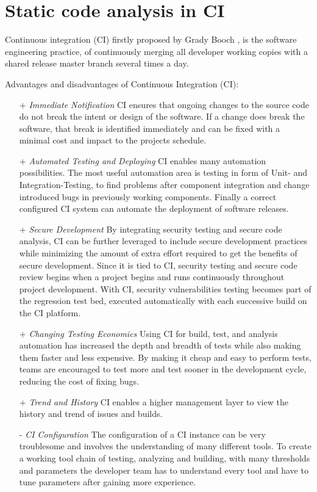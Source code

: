 \documentclass[conference]{IEEEtran}
\begin{document}
\section{Static code analysis in CI}
\label{sec:static_code_analysis_ci}
Continuous integration (CI) firstly proposed by Grady Booch \cite{CI-Definition:Booch:1993}, is the software engineering practice, of continuously merging all developer working copies with a shared release master branch several times a day.

Advantages and disadvantages of Continuous Integration (CI)\cite{SecurityinCI}:
\begin{itemize}
	\item[+] \textit{Immediate Notification}
	CI ensures that ongoing changes to the source code do not break the intent or design of the software. If a change does break the software, that break is identified immediately and can be fixed with a minimal cost and impact to the projects schedule.
	\item[+] \textit{Automated Testing and Deploying}
	CI enables many automation possibilities. The most useful automation area is testing in form of Unit- and Integration-Testing, to find problems after component integration and change introduced bugs in previously working components. 
	Finally a correct configured CI system can automate the deployment of software releases. 
	\item[+] \textit{Secure Development}
	By integrating security testing and secure code analysis, CI can be further leveraged to include secure development practices while minimizing the amount of extra effort required to get the benefits of secure development. Since it is tied to CI,
	security testing and secure code review begins when a project begins and runs continuously
	throughout project development. With CI, security vulnerabilities testing becomes part of the regression test bed, executed automatically with each successive build on the CI platform.
	
	\item[+] \textit{Changing Testing Economics}
	Using CI for build, test, and analysis automation has increased the depth and breadth of tests while also making them faster and less expensive. By making it cheap and easy to perform tests, teams are encouraged to test more and test sooner in the development cycle, reducing the cost of fixing bugs.
	
	\item[+] \textit{Trend and History}
	CI enables a higher management layer to view the history and trend of issues and builds.
	
	\item[-] \textit{CI Configuration}
	The configuration of a CI instance can be very troublesome and involves the understanding of many different tools. To create a working tool chain of testing, analyzing and building, with many thresholds and parameters the developer team has to understand every tool and have to tune parameters after gaining more experience.
\end{itemize}
\end{document}
